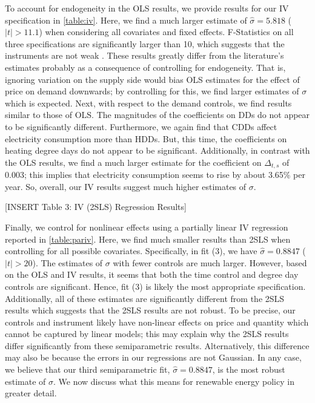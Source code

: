 \documentclass[11pt,a4paper,leqno]{extarticle}
\begin{document}
	
	To account for endogeneity in the OLS results, we provide results for our IV specification in \autoref{table:iv}. Here, we find a much larger estimate of $\hat{\sigma}  = 5.818$ ($|t| > 11.1$) when considering all covariates and fixed effects. F-Statistics on all three specifications are significantly larger than 10, which suggests that the instruments are not weak \citep{SS1997}. These results greatly differ from the literature's estimates probably as a consequence of controlling for endogeneity. That is, ignoring variation on the supply side would bias OLS estimates for the effect of price on demand downwards; by controlling for this, we find larger estimates of $\sigma$ which is expected. Next, with respect to the demand controls, we find results similar to those of OLS. The magnitudes of the coefficients on DDs do not appear to be significantly different. Furthermore, we again find that CDDs affect electricity consumption more than HDDs. But, this time, the coefficients on heating degree days do not appear to be significant. Additionally, in contrast with the OLS results, we find a much larger estimate for the coefficient on $\Delta_{t,s}$ of $0.003$; this implies that electricity consumption seems to rise by about 3.65\% per year. So, overall, our IV results suggest much higher estimates of $\sigma$. 
	
	
	\vspace{0.15in}
	\begin{center}
		[INSERT Table 3: IV (2SLS) Regression Results]
	\end{center}
	\vspace{0.15in}
	
	Finally, we control for nonlinear effects using a partially linear IV regression reported in \autoref{table:pariv}. Here, we find much smaller results than 2SLS when controlling for all possible covariates. Specifically, in fit (3), we have $\hat{\sigma} = 0.8847$ ($|t| > 20$). The estimates of $\sigma$ with fewer controls are much larger. However, based on the OLS and IV results, it seems that both the time control and degree day controls are significant. Hence, fit (3) is likely the most appropriate specification. Additionally, all of these estimates are significantly different from the 2SLS results which suggests that the 2SLS results are not robust. To be precise, our controls and instrument likely have non-linear effects on price and quantity which cannot be captured by linear models; this may explain why the 2SLS results differ significantly from these semiparametric results. Alternatively, this difference may also be because the errors in our regressions are not Gaussian. In any case, we  believe that our third semiparametric fit, $\hat{\sigma} = 0.8847$, is the most robust estimate of $\sigma$. We now discuss what this means for renewable energy policy in greater detail. 
	
\end{document}

